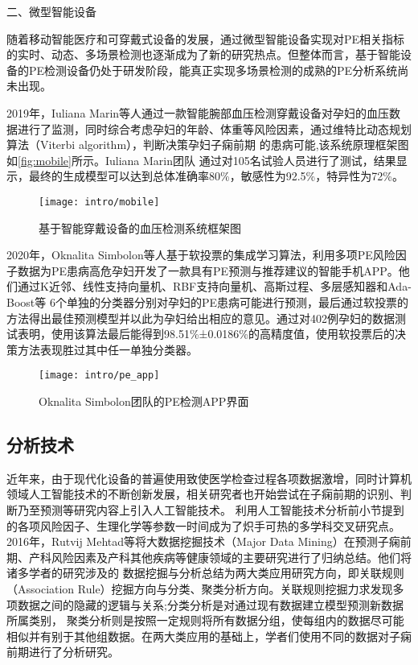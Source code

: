 二、微型智能设备

随着移动智能医疗和可穿戴式设备的发展，通过微型智能设备实现对PE相关指标的实时、动态、多场景检测也逐渐成为了新的研究热点。但整体而言，基于智能设备的PE检测设备仍处于研发阶段，能真正实现多场景检测的成熟的PE分析系统尚未出现。
% 

2019年，Iuliana Marin等人\cite{Marin2019,Marin2020}通过一款智能腕部血压检测穿戴设备对孕妇的血压数据进行了监测，同时综合考虑孕妇的年龄、体重等风险因素，通过维特比动态规划算法（Viterbi algorithm），判断决策孕妇子痫前期
的患病可能,该系统原理框架图如\autoref{fig:mobile}所示。Iuliana Marin团队
通过对105名试验人员进行了测试，结果显示，最终的生成模型可以达到总体准确率80\%，敏感性为92.5\%，特异性为72\%\cite{Marin2019}。
\begin{figure}[htbp]
    \centering
    \texttt{[image: intro/mobile]}
    \caption[基于智能穿戴设备的血压检测系统框架图]{\label{fig:mobile}基于智能穿戴设备的血压检测系统框架图\cite{Marin2019,Marin2020}}
\end{figure}

2020年，Oknalita Simbolon等人基于软投票的集成学习算法，利用多项PE风险因子数据为PE患病高危孕妇开发了一款具有PE预测与推荐建议的智能手机APP\cite{Simbolon2020}。他们通过K近邻、线性支持向量机、RBF支持向量机、高斯过程、多层感知器和Ada-Boost等
6个单独的分类器分别对孕妇的PE患病可能进行预测，最后通过软投票的方法得出最佳预测模型并以此为孕妇给出相应的意见。通过对402例孕妇的数据测试表明，使用该算法最后能得到98.51\%±0.0186\%的高精度值，使用软投票后的决策方法表现胜过其中任一单独分类器。
\begin{figure}[htbp]
    \centering
    \texttt{[image: intro/pe\_app]}
    \caption[Oknalita Simbolon团队的PE检测APP界面]{\label{fig:pe_app}Oknalita Simbolon团队的PE检测APP界面\cite{Simbolon2020}}
\end{figure}

\subsection{分析技术}
近年来，由于现代化设备的普遍使用致使医学检查过程各项数据激增，同时计算机领域人工智能技术的不断创新发展，相关研究者也开始尝试在子痫前期的识别、判断乃至预测等研究内容上引入人工智能技术。
利用人工智能技术分析前小节提到的各项风险因子、生理化学等参数一时间成为了炽手可热的多学科交叉研究点。
2016年，Rutvij Mehtad等\cite{Mehta2016}将大数据挖掘技术（Major Data Mining）在预测子痫前期、产科风险因素及产科其他疾病等健康领域的主要研究进行了归纳总结。他们将诸多学者的研究涉及的
数据挖掘与分析总结为两大类应用研究方向，即关联规则（Association Rule）挖掘方向与分类、聚类分析方向。关联规则挖掘力求发现多项数据之间的隐藏的逻辑与关系;分类分析是对通过现有数据建立模型预测新数据所属类别，
聚类分析则是按照一定规则将所有数据分组，使每组内的数据尽可能相似并有别于其他组数据\cite{Han2006}。在两大类应用的基础上，学者们使用不同的数据对子痫前期进行了分析研究。

